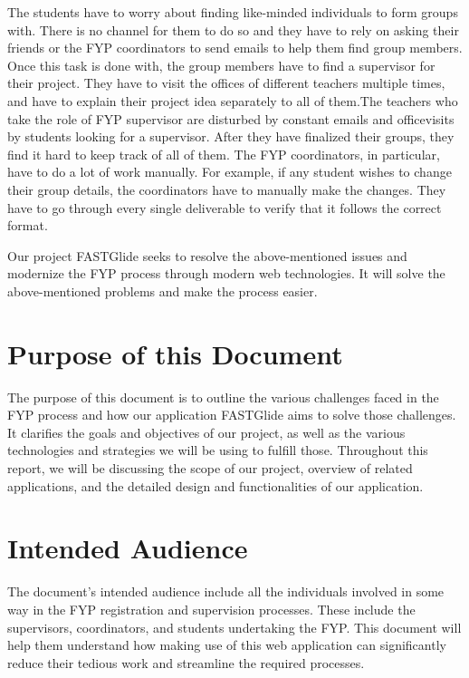 \documentclass{FastFyp}
\begin{document}
The students have to worry about finding like-minded individuals to form groups with. There
is no channel for them to do so and they have to rely on asking their friends or the FYP
coordinators to send emails to help them find group members. Once this task is done with, the
group members have to find a supervisor for their project. They have to visit the offices of
different teachers multiple times, and have to explain their project idea separately to all of
them.The teachers who take the role of FYP supervisor are disturbed by constant emails and officevisits by students looking for a supervisor. After they have finalized their groups, they find it
hard to keep track of all of them. The FYP coordinators, in particular, have to do a lot of work manually. For example, if any student wishes to change their group details, the coordinators have to manually make the changes. They have to go through every single deliverable to verify that it follows the correct format.

Our project FASTGlide seeks to resolve the above-mentioned issues and modernize the FYP
process through modern web technologies. It will solve the above-mentioned problems and make the process easier.
\section{Purpose of this Document}
The purpose of this document is to outline the various challenges faced in the FYP process and how our application FASTGlide aims to solve those challenges. It clarifies the goals and objectives of our project, as well as the various technologies and strategies we will be using to fulfill those. Throughout this report, we will be discussing the scope of our project, overview of related applications, and the detailed design and functionalities of our application.
\section{Intended Audience}
The document’s intended audience include all the individuals involved in some way 
in the FYP registration and supervision processes. These include the supervisors, coordinators, and students undertaking the FYP. This document will help them understand how making use of this web application can significantly reduce their tedious work and streamline the required processes.
\end{document}

